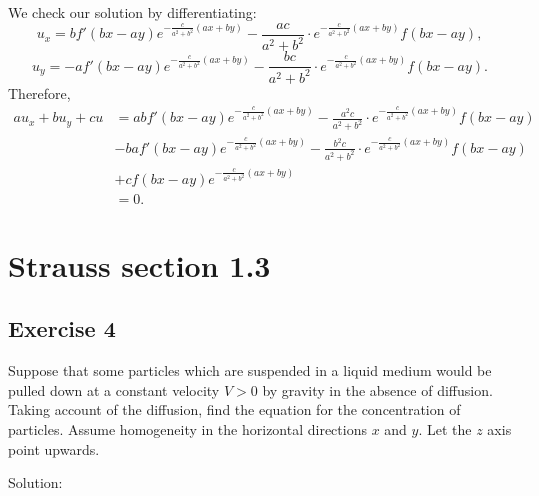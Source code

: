 \documentclass{article}
\begin{document}
		We check our solution by differentiating:
				\[u_x= b f'(bx-ay)e^{-\frac{c}{a^2+b^2}(ax+by)} -\frac{ac}{a^2+b^2} \cdot e^{-\frac{c}{a^2+b^2}(ax+by)}f(bx-ay),\]
				\[u_y= -a f'(bx-ay)e^{-\frac{c}{a^2+b^2}(ax+by)} -\frac{bc}{a^2+b^2} \cdot e^{-\frac{c}{a^2+b^2}(ax+by)}f(bx-ay).\]	
		Therefore,
		\begin{equation*}
			\begin{aligned}
				au_x+bu_y+cu&= 
				ab f'(bx-ay)e^{-\frac{c}{a^2+b^2}(ax+by)} -\frac{a^2c}{a^2+b^2} \cdot e^{-\frac{c}{a^2+b^2}(ax+by)}f(bx-ay)\\
				&-b a f'(bx-ay)e^{-\frac{c}{a^2+b^2}(ax+by)}-\frac{b^2c}{a^2+b^2} \cdot e^{-\frac{c}{a^2+b^2}(ax+by)}f(bx-ay) \\
				& +cf(bx-ay)e^{-\frac{c}{a^2+b^2}(ax+by)} \\
				&=0.
			\end{aligned}
		\end{equation*}

\section{Strauss section 1.3}
\subsection{Exercise 4}
		Suppose that some particles which are
			suspended in a liquid medium would be pulled down
			at a constant velocity $V > 0$ by gravity in the
			absence of diffusion. Taking account of the
			diffusion, find the equation for the concentration
			of particles. Assume homogeneity in the horizontal
			directions $x$ and $y$. Let the $z$ axis point upwards.

			Solution:

\end{document}
